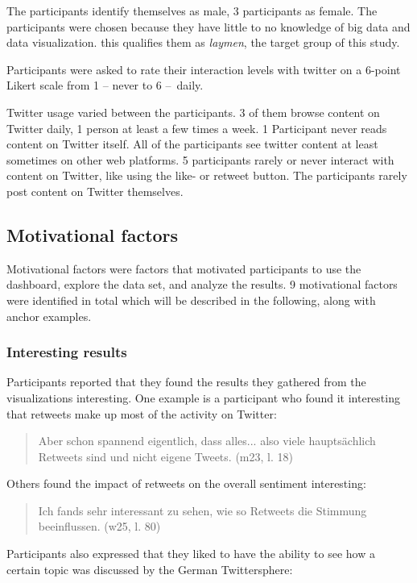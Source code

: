 The participants identify themselves as male, 3 participants as female. The participants were chosen because they have little to no knowledge of big data and data visualization. this qualifies them as \emph{laymen}, the target group of this study.

Participants were asked to rate their interaction levels with twitter on a 6-point Likert scale from 1 – never to 6 – daily.

Twitter usage varied between the participants. 3 of them browse content on Twitter daily, 1 person at least a few times a week. 1 Participant never reads content on Twitter itself. All of the participants see twitter content at least sometimes on other web platforms. 5 participants rarely or never interact with content on Twitter, like using the like- or retweet button. The participants rarely post content on Twitter themselves.

\subsection{Motivational factors}
Motivational factors were factors that motivated participants to use the dashboard, explore the data set, and analyze the results. 9 motivational factors were identified in total which will be described in the following, along with anchor examples.

\subsubsection*{Interesting results}
Participants reported that they found the results they gathered from the visualizations interesting. One example is a participant who found it interesting that retweets make up most of the activity on Twitter:

\begin{quote}
    Aber schon spannend eigentlich, dass alles... also viele hauptsächlich Retweets sind und nicht eigene Tweets. (m23, l. 18)
\end{quote}

Others found the impact of retweets on the overall sentiment interesting:

\begin{quote}
    Ich fands sehr interessant zu sehen, wie so Retweets die Stimmung beeinflussen. (w25, l. 80)
\end{quote}

Participants also expressed that they liked to have the ability to see how a certain topic was discussed by the German Twittersphere:

